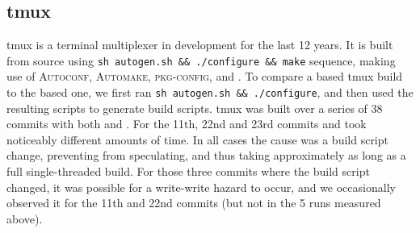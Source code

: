 
\subsection{tmux}
\label{sec:eval:tmux}



tmux is a terminal multiplexer in development for the last 12 years.  It is built from source using \verb|sh autogen.sh && ./configure && make| sequence, making use of \textsc{Autoconf}, \textsc{Automake}, \textsc{pkg-config}, and \Make.
To compare a \Rattle based tmux build to the \Make based one, we first ran \texttt{sh autogen.sh \&\& ./configure}, and then used the resulting \Make scripts to generate \Rattle build scripts. tmux was built over a series of 38 commits with both \Make and \Rattle. For the 11th, 22nd and 23rd commits \Rattle and \Make took noticeably different amounts of time. In all cases the cause was a build script change, preventing \Rattle from speculating, and thus taking approximately as long as a full single-threaded build.  For those three commits where the build script changed, it was possible for a write-write hazard to occur, and we occasionally observed it for the 11th and 22nd commits (but not in the 5 runs measured above).

